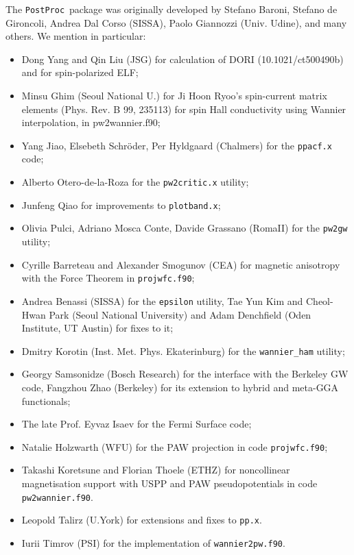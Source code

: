 \documentclass[12pt,a4paper]{article}
\def\PostProc{\texttt{PostProc}}
\begin{document}
The \PostProc\ package was originally developed by Stefano Baroni, 
Stefano de Gironcoli, Andrea Dal Corso (SISSA), Paolo Giannozzi 
(Univ. Udine), and many others. We mention in particular: 
\begin{itemize}
\item Dong Yang and Qin Liu (JSG) for calculation of DORI (10.1021/ct500490b)
      and for spin-polarized ELF;
\item Minsu Ghim (Seoul National U.) for Ji Hoon Ryoo's spin-current matrix
      elements (Phys. Rev. B 99, 235113) for spin Hall conductivity using
      Wannier interpolation, in pw2wannier.f90;
\item Yang Jiao, Elsebeth Schr\"oder, Per Hyldgaard (Chalmers) for the
  \texttt{ppacf.x} code;
\item Alberto Otero-de-la-Roza for the \texttt{pw2critic.x} utility;
\item Junfeng Qiao for improvements to \texttt{plotband.x};
\item Olivia Pulci, Adriano Mosca Conte, Davide Grassano (RomaII)
      for the \texttt{pw2gw} utility;
\item Cyrille Barreteau and Alexander Smogunov (CEA) for 
      magnetic anisotropy with the Force Theorem in \texttt{projwfc.f90};
\item Andrea Benassi (SISSA) for the \texttt{epsilon} utility,
      Tae Yun Kim and Cheol-Hwan Park (Seoul National University)
      and Adam Denchfield (Oden Institute, UT Austin) for fixes to it;
\item Dmitry Korotin (Inst. Met. Phys. Ekaterinburg) for the
      \texttt{wannier\_ham} utility;
\item Georgy Samsonidze (Bosch Research) for the interface
      with the Berkeley GW code, Fangzhou Zhao (Berkeley) 
      for its extension to hybrid and meta-GGA functionals;
\item The late Prof. Eyvaz Isaev for the Fermi Surface code;
\item Natalie Holzwarth (WFU) for the PAW projection in code
     \texttt{projwfc.f90};
\item Takashi Koretsune and Florian Thoele (ETHZ) for noncollinear 
      magnetisation support with USPP and PAW pseudopotentials in 
      code \texttt{pw2wannier.f90}.
\item Leopold Talirz (U.York) for extensions and fixes to \texttt{pp.x}.
\item Iurii Timrov (PSI) for the implementation of \texttt{wannier2pw.f90}.
\end{itemize}
\end{document}
